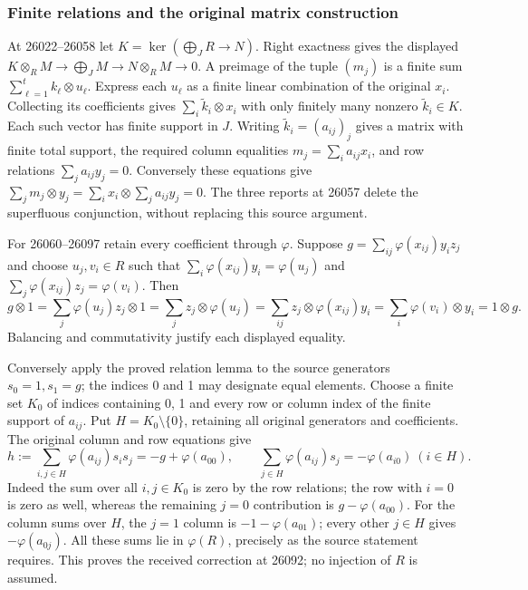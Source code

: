 \subsubsection{Finite relations and the original matrix construction}\label{finite-relations-and-the-original-matrix-construction}

At 26022--26058 let \(K=\ker(\bigoplus_JR\to N)\). Right exactness gives the displayed \(K\otimes_RM\to\bigoplus_JM\to N\otimes_RM\to0\). A preimage of the tuple \((m_j)\) is a finite sum \(\sum_{\ell=1}^t k_\ell\otimes u_\ell\). Express each \(u_\ell\) as a finite linear combination of the original \(x_i\). Collecting its coefficients gives \(\sum_i\widetilde k_i\otimes x_i\) with only finitely many nonzero \(\widetilde k_i\in K\). Each such vector has finite support in \(J\). Writing \(\widetilde k_i=(a_{ij})_j\) gives a matrix with finite total support, the required column equalities \(m_j=\sum_i a_{ij}x_i\), and row relations \(\sum_j a_{ij}y_j=0\). Conversely these equations give \(\sum_jm_j\otimes y_j=\sum_i x_i\otimes\sum_j a_{ij}y_j=0\). The three reports at 26057 delete the superfluous conjunction, without replacing this source argument.

For 26060--26097 retain every coefficient through \(\varphi\). Suppose \(g=\sum_{ij}\varphi(x_{ij})y_i z_j\) and choose \(u_j,v_i\in R\) such that \(\sum_i\varphi(x_{ij})y_i=\varphi(u_j)\) and \(\sum_j\varphi(x_{ij})z_j=\varphi(v_i)\). Then \[
g\otimes1
=\sum_j\varphi(u_j)z_j\otimes1
=\sum_j z_j\otimes\varphi(u_j)
=\sum_{ij}z_j\otimes\varphi(x_{ij})y_i
=\sum_i\varphi(v_i)\otimes y_i
=1\otimes g .
\] Balancing and commutativity justify each displayed equality.

Conversely apply the proved relation lemma to the source generators \(s_0=1,s_1=g\); the indices 0 and 1 may designate equal elements. Choose a finite set \(K_0\) of indices containing 0, 1 and every row or column index of the finite support of \(a_{ij}\). Put \(H=K_0\setminus\{0\}\), retaining all original generators and coefficients. The original column and row equations give \[
h:=\sum_{i,j\in H}\varphi(a_{ij})s_i s_j
=-g+\varphi(a_{00}),\qquad
\sum_{j\in H}\varphi(a_{ij})s_j=-\varphi(a_{i0})\ (i\in H).
\] Indeed the sum over all \(i,j\in K_0\) is zero by the row relations; the row with \(i=0\) is zero as well, whereas the remaining \(j=0\) contribution is \(g-\varphi(a_{00})\). For the column sums over \(H\), the \(j=1\) column is \(-1-\varphi(a_{01})\); every other \(j\in H\) gives \(-\varphi(a_{0j})\). All these sums lie in \(\varphi(R)\), precisely as the source statement requires. This proves the received correction at 26092; no injection of \(R\) is assumed.

